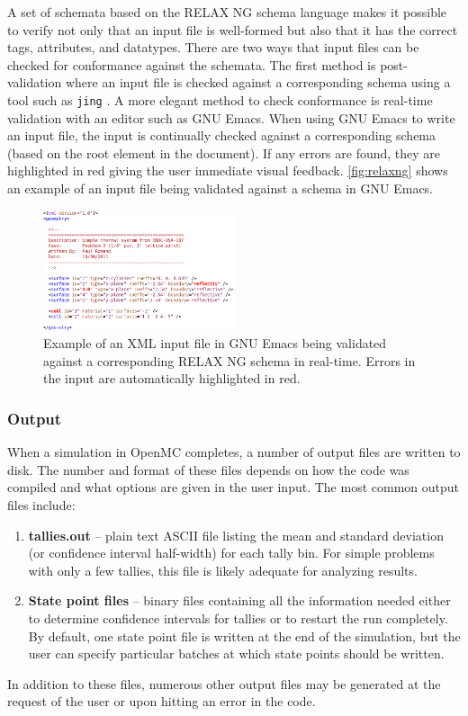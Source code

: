 \documentclass{snamc2013}
\begin{document}
A set of schemata based on the RELAX NG schema language \cite{relaxng-2008}
makes it possible to verify not only that an input file is well-formed but also
that it has the correct tags, attributes, and datatypes. There are two ways that
input files can be checked for conformance against the schemata. The first
method is post-validation where an input file is checked against a corresponding
schema using a tool such as \texttt{jing} \cite{jing-2012}. A more elegant
method to check conformance is real-time validation with an editor such as GNU
Emacs. When using GNU Emacs to write an input file, the input is continually
checked against a corresponding schema (based on the root element in the
document). If any errors are found, they are highlighted in red giving the user
immediate visual feedback. \autoref{fig:relaxng} shows an example of an input
file being validated against a schema in GNU Emacs.
\begin{figure}[htb]
  \centering
  \includegraphics[width=0.5\textwidth]{images/relaxng.png}
  \caption{Example of an XML input file in GNU Emacs being validated against a
    corresponding RELAX NG schema in real-time. Errors in the input are
    automatically highlighted in red.}
  \label{fig:relaxng}
\end{figure}

\subsubsection{Output}

When a simulation in OpenMC completes, a number of output files are written to
disk. The number and format of these files depends on how the code was compiled
and what options are given in the user input. The most common output files
include:
\begin{enumerate}
\item \textbf{tallies.out} -- plain text ASCII file listing the mean and
  standard deviation (or confidence interval half-width) for each tally bin. For
  simple problems with only a few tallies, this file is likely adequate for
  analyzing results.
\item \textbf{State point files} -- binary files containing all the
  information needed either to determine confidence intervals for tallies or to
  restart the run completely. By default, one state point file is written at the
  end of the simulation, but the user can specify particular batches at which
  state points should be written.
\end{enumerate}
In addition to these files, numerous other output files may be generated at the
request of the user or upon hitting an error in the code.
\end{document}
